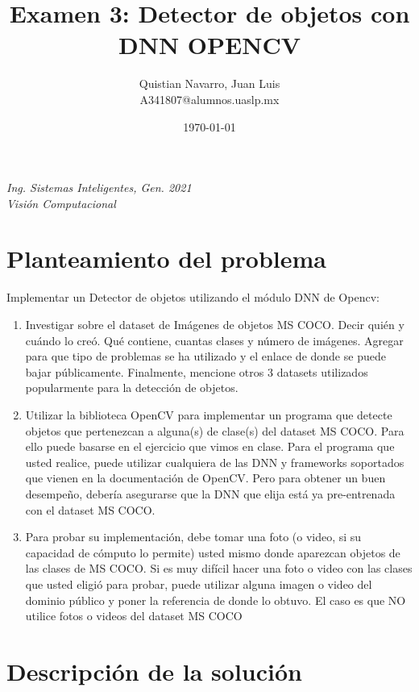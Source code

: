 \documentclass{article}
\title{Examen 3: Detector de objetos con DNN OPENCV}
\author{
  \begin{minipage}[t]{0.4\linewidth}
    \centering
    Quistian Navarro, Juan Luis\\
    A341807@alumnos.uaslp.mx 
  \end{minipage}
}
\date{\today}
\begin{document}
\maketitle

\begin{minipage}{\textwidth}
    \centering
    \textit{Ing. Sistemas Inteligentes, Gen. 2021} \\
    \textit{Visión Computacional}
\end{minipage}

\small
\section{Planteamiento del problema}
Implementar un Detector de objetos  utilizando el módulo DNN de Opencv:

\begin{enumerate}[label=\alph*)]
    \item Investigar sobre el dataset de Imágenes de objetos MS COCO. Decir quién y cuándo lo creó. Qué
    contiene, cuantas clases y número de imágenes. Agregar para que tipo de problemas se ha utilizado
    y el enlace de donde se puede bajar públicamente. Finalmente, mencione otros 3 datasets utilizados
    popularmente para la detección de objetos.
    \item Utilizar la biblioteca OpenCV para implementar un programa que detecte objetos que pertenezcan
    a alguna(s) de clase(s) del dataset MS COCO. Para ello puede basarse en el ejercicio que vimos
    en clase. Para el programa que usted realice, puede utilizar cualquiera de las DNN y frameworks
    soportados que vienen en la documentación de OpenCV. Pero para obtener un buen desempeño,
    debería asegurarse que la DNN que elija está ya pre-entrenada con el dataset MS COCO.
    \item Para probar su implementación, debe tomar una foto (o video, si su capacidad de cómputo lo
    permite) usted mismo donde aparezcan objetos de las clases de MS COCO. Si es muy difícil hacer
    una foto o video con las clases que usted eligió para probar, puede utilizar alguna imagen o video
    del dominio público y poner la referencia de donde lo obtuvo. El caso es que NO utilice fotos o
    videos del dataset MS COCO
\end{enumerate}
\section{Descripción de la solución}
\end{document}
